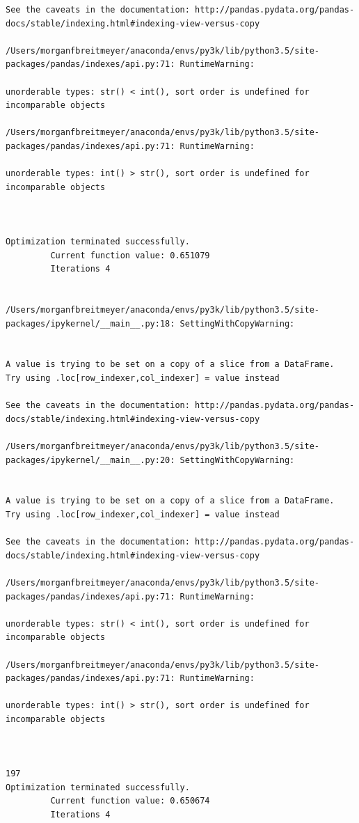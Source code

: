 \begin{lstlisting}
See the caveats in the documentation: http://pandas.pydata.org/pandas-docs/stable/indexing.html#indexing-view-versus-copy

/Users/morganfbreitmeyer/anaconda/envs/py3k/lib/python3.5/site-packages/pandas/indexes/api.py:71: RuntimeWarning:

unorderable types: str() < int(), sort order is undefined for incomparable objects

/Users/morganfbreitmeyer/anaconda/envs/py3k/lib/python3.5/site-packages/pandas/indexes/api.py:71: RuntimeWarning:

unorderable types: int() > str(), sort order is undefined for incomparable objects



Optimization terminated successfully.
         Current function value: 0.651079
         Iterations 4


/Users/morganfbreitmeyer/anaconda/envs/py3k/lib/python3.5/site-packages/ipykernel/__main__.py:18: SettingWithCopyWarning:


A value is trying to be set on a copy of a slice from a DataFrame.
Try using .loc[row_indexer,col_indexer] = value instead

See the caveats in the documentation: http://pandas.pydata.org/pandas-docs/stable/indexing.html#indexing-view-versus-copy

/Users/morganfbreitmeyer/anaconda/envs/py3k/lib/python3.5/site-packages/ipykernel/__main__.py:20: SettingWithCopyWarning:


A value is trying to be set on a copy of a slice from a DataFrame.
Try using .loc[row_indexer,col_indexer] = value instead

See the caveats in the documentation: http://pandas.pydata.org/pandas-docs/stable/indexing.html#indexing-view-versus-copy

/Users/morganfbreitmeyer/anaconda/envs/py3k/lib/python3.5/site-packages/pandas/indexes/api.py:71: RuntimeWarning:

unorderable types: str() < int(), sort order is undefined for incomparable objects

/Users/morganfbreitmeyer/anaconda/envs/py3k/lib/python3.5/site-packages/pandas/indexes/api.py:71: RuntimeWarning:

unorderable types: int() > str(), sort order is undefined for incomparable objects



197
Optimization terminated successfully.
         Current function value: 0.650674
         Iterations 4



\end{lstlisting}
